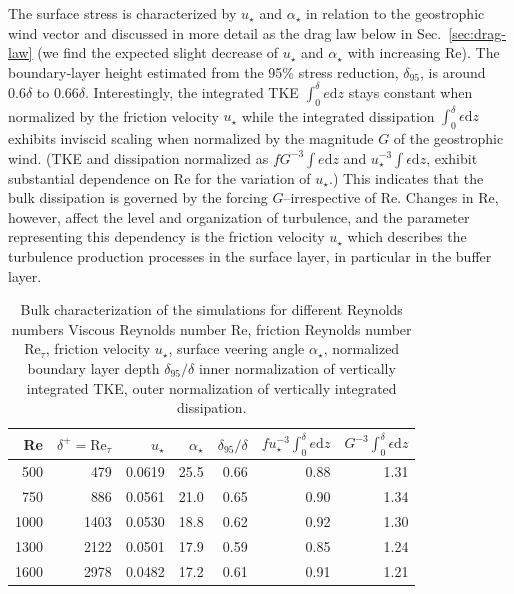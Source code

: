 \documentclass[a4paper,11pt]{amsart}
\newcommand{\RE}{\mathrm{Re}}
\begin{document}
%
The surface stress is characterized by $u_\star$ and $\alpha_\star$ in relation to the geostrophic wind vector
and discussed in more detail as the drag law below in Sec.~\ref{sec:drag-law}
(we find the expected slight decrease of $u_\star$ and $\alpha_\star$ with increasing $\RE$).
%
The boundary-layer height estimated from the 95\% stress reduction, $\delta_{95}$, is around $0.6\delta$ to $0.66\delta$. 
%
Interestingly, the integrated TKE $\int_{0}^{\delta} e\mathrm{d}z$ stays constant when normalized by the friction velocity $u_\star$
while the integrated dissipation $\int_{0}^{\delta} \epsilon\mathrm{d}z$ exhibits inviscid scaling when normalized
by the magnitude $G$ of the geostrophic wind. 
%
(TKE and dissipation normalized as
$f G^{-3} \int e \mathrm{d} z$ and $u_\star^{-3} \int \epsilon\mathrm{d}z$, exhibit substantial
dependence on $\RE$ for the variation of $u_\star$.)
%
This indicates that the bulk dissipation is governed by the forcing $G$--irrespective of $\RE$. 
%
Changes in $\RE$, however, affect the level and organization of turbulence, and the parameter
representing this dependency is the friction velocity $u_\star$ which describes the turbulence
production processes in the surface layer, in particular in the buffer layer. 
% 
\begin{table}
  \caption{Bulk characterization of the simulations for different Reynolds numbers 
    Viscous Reynolds number $\RE$,
    friction Reynolds number  $\RE_\tau$,
    friction velocity $u_\star$,
    surface veering angle $\alpha_\star$,
    normalized boundary layer depth $\delta_{95}/\delta$
    inner normalization of vertically integrated TKE,
    outer normalization of vertically integrated dissipation.
    \label{tab:bulk_results}}
  \begin{tabular}{r r r r r r r }
    \toprule
    Re & $\delta^+=\RE_\tau$& $u_\star$ & $\alpha_\star$ & $\delta_{95}/\delta$ & $f u_\star^{-3}\int_{0}^{\delta} e \mathrm{d} z $ & $ G^{-3}\int_{0}^{\delta} \epsilon \mathrm{d}z$\\
      \midrule 
      \rowcolor{gray!30} 
      500 & 479 & 0.0619& 25.5 & 0.66& 0.88& 1.31 \\
      \rowcolor{gray!30} 
      750 & 886 & 0.0561& 21.0 & 0.65& 0.90& 1.34 \\
      \rowcolor{gray!30}
      1000& 1403& 0.0530& 18.8 & 0.62& 0.92& 1.30 \\
      \midrule
      1300& 2122& 0.0501& 17.9 & 0.59& 0.85& 1.24 \\
      1600& 2978& 0.0482& 17.2 & 0.61& 0.91& 1.21 \\ 
      \bottomrule
    \end{tabular}
\end{table} 
\end{document}
